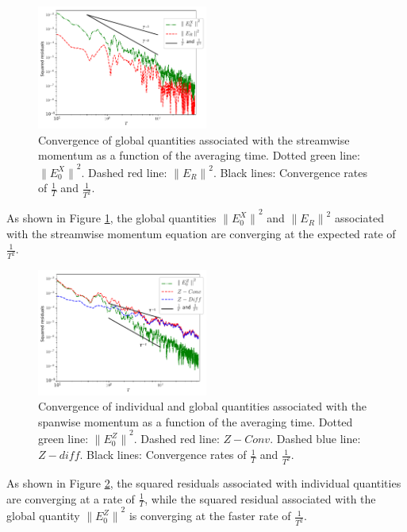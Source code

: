\documentclass[aip,pof,reprint]{revtex4-1}
\begin{document}
\begin{figure}
\includegraphics[width=0.5\textwidth]{streamwise_convergence.pdf}
\caption{\label{fig_x}Convergence of global quantities associated with the streamwise momentum as a function of the averaging time. Dotted green line: ${\parallel{E_0^X}\parallel}^2$. Dashed red line: ${\parallel{E_R}\parallel}^2$. Black lines: Convergence rates of $\frac{1}{T}$ and $\frac{1}{T^2}$.}
\end{figure}

As shown in Figure \ref{fig_x}, the global quantities ${\parallel{E_0^X}\parallel}^2$ and ${\parallel{E_R}\parallel}^2$ associated with the streamwise momentum equation are converging at the expected rate of $\frac{1}{T^2}$.

\begin{figure}
\includegraphics[width=0.5\textwidth]{spanwise_convergence.pdf}
\caption{\label{fig_z}Convergence of individual and global quantities associated with the spanwise momentum as a function of the averaging time. Dotted green line: ${\parallel{E_0^Z}\parallel}^2$. Dashed red line: $Z-Conv$. Dashed blue line: $Z-diff$. Black lines: Convergence rates of $\frac{1}{T}$ and $\frac{1}{T^2}$.}
\end{figure}

As shown in Figure \ref{fig_z}, the squared residuals associated with individual quantities are converging at a rate of $\frac{1}{T}$, while the squared residual associated with the global quantity ${\parallel{E_0^Z}\parallel}^2$ is converging at the faster rate of $\frac{1}{T^2}$.
\end{document}
